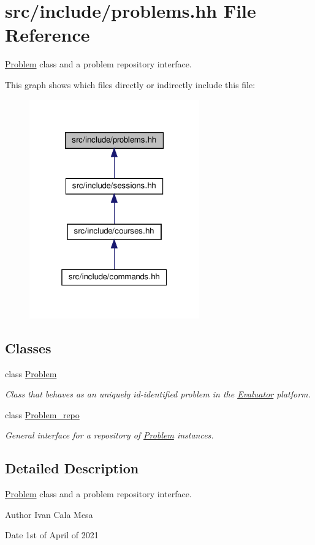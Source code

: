 \hypertarget{problems_8hh}{}\section{src/include/problems.hh File Reference}
\label{problems_8hh}


\hyperlink{classProblem}{Problem} class and a problem repository interface.  


This graph shows which files directly or indirectly include this file\+:
\nopagebreak
\begin{figure}[H]
\begin{center}
\leavevmode
\includegraphics[width=208pt]{problems_8hh__dep__incl}
\end{center}
\end{figure}
\subsection*{Classes}
\begin{DoxyCompactItemize}
\item 
class \hyperlink{classProblem}{Problem}
\begin{DoxyCompactList}\small\item\em Class that behaves as an uniquely id-\/identified problem in the \hyperlink{classEvaluator}{Evaluator} platform. \end{DoxyCompactList}\item 
class \hyperlink{classProblem__repo}{Problem\+\_\+repo}
\begin{DoxyCompactList}\small\item\em General interface for a repository of \hyperlink{classProblem}{Problem} instances. \end{DoxyCompactList}\end{DoxyCompactItemize}


\subsection{Detailed Description}
\hyperlink{classProblem}{Problem} class and a problem repository interface. 

\begin{DoxyAuthor}{Author}
Ivan Cala Mesa 
\end{DoxyAuthor}
\begin{DoxyDate}{Date}
1st of April of 2021 
\end{DoxyDate}
